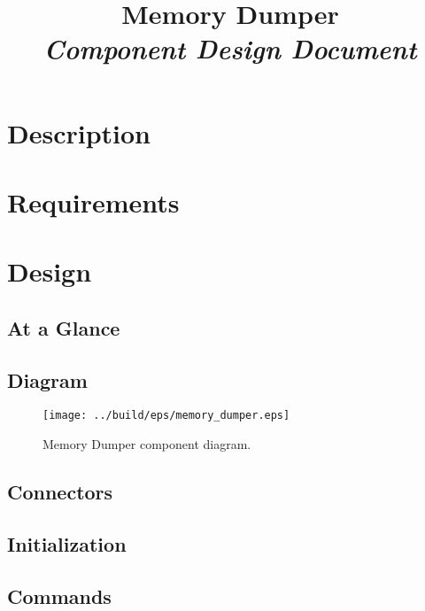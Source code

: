 



\title{\textbf{Memory Dumper} \\
\large\textit{Component Design Document}}
\date{}
\maketitle

\section{Description}


\section{Requirements}


\section{Design}

\subsection{At a Glance}


\subsection{Diagram}
\begin{figure}[H]
  \texttt{[image: ../build/eps/memory\_dumper.eps]}
  \caption{Memory Dumper component diagram.}
\end{figure}

\subsection{Connectors}


\subsection{Initialization}


\subsection{Commands}

